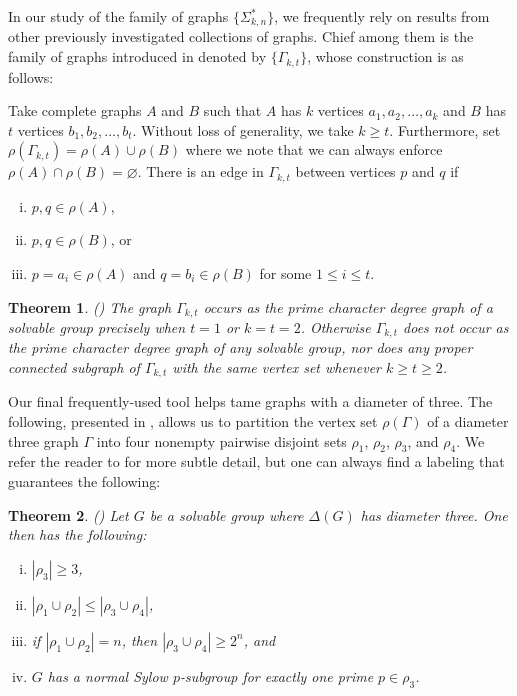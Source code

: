 \documentclass[11pt]{amsart}
\newtheorem{theorem}{Theorem}[section]
\theoremstyle{definition}
\theoremstyle{remark}
\numberwithin{equation}{section}
\newcommand{\SLR}[2]{\Sigma_{#1,#2}^*} %
\begin{document}
In our study of the family of graphs $\{\SLR{k}{n}\}$, we frequently rely on results from other previously investigated collections of graphs. Chief among them is the family of graphs introduced in \cite{BL} denoted by $\{\Gamma_{k,t}\}$, whose construction is as follows:

Take complete graphs $A$ and $B$ such that $A$ has $k$ vertices $a_1, a_2, \ldots, a_k$ and $B$ has $t$ vertices $b_1, b_2, \ldots, b_t$. Without loss of generality, we take $k\geq t$. Furthermore, set $\rho(\Gamma_{k,t})=\rho(A)\cup\rho(B)$ where we note that we can always enforce $\rho(A)\cap\rho(B)=\varnothing$. There is an edge in $\Gamma_{k,t}$ between vertices $p$ and $q$ if
\begin{enumerate}[(i)]
    \item $p,q\in\rho(A)$,
    \item $p,q\in\rho(B)$, or
    \item $p=a_i\in\rho(A)$ and $q=b_i\in\rho(B)$ for some $1\leq i\leq t$.
\end{enumerate}

\begin{theorem}\label{KT}\emph{(\cite{BL})}
The graph $\Gamma_{k,t}$ occurs as the prime character degree graph of a solvable group precisely when $t=1$ or $k=t=2$. Otherwise $\Gamma_{k,t}$ does not occur as the prime character degree graph of any solvable group, nor does any proper connected subgraph of $\Gamma_{k,t}$ with the same vertex set whenever $k\geq t\geq2$.
\end{theorem}

Our final frequently-used tool helps tame graphs with a diameter of three. The following, presented in \cite{S}, allows us to partition the vertex set $\rho(\Gamma)$ of a diameter three graph $\Gamma$ into four nonempty pairwise disjoint sets $\rho_1$, $\rho_2$, $\rho_3$, and $\rho_4$. We refer the reader to \cite{S} for more subtle detail, but one can always find a labeling that guarantees the following:

\begin{theorem}\label{diameter}\emph{(\cite{S})}
Let $G$ be a solvable group where $\Delta(G)$ has diameter three. One then has the following:
\begin{enumerate}[(i)]
    \item\label{diam1} $|\rho_3|\geq3$,
    \item\label{diam2} $|\rho_1\cup\rho_2|\leq|\rho_3\cup\rho_4|$,
    \item\label{diam3} if $|\rho_1\cup\rho_2|=n$, then $|\rho_3\cup\rho_4|\geq2^n$, and
    \item\label{diam4} $G$ has a normal Sylow $p$-subgroup for exactly one prime $p\in\rho_3$.
\end{enumerate}
\end{theorem}
\end{document}
